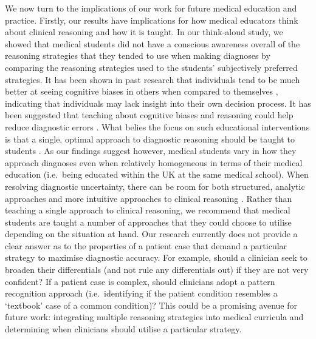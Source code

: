 \documentclass[a4paper, nobind]{templates/ociamthesis}
\begin{document}
We now turn to the implications of our work for future medical education and practice. Firstly, our results have implications for how medical educators think about clinical reasoning and how it is taught. In our think-aloud study, we showed that medical students did not have a conscious awareness overall of the reasoning strategies that they tended to use when making diagnoses by comparing the reasoning strategies used to the students' subjectively preferred strategies. It has been shown in past research that individuals tend to be much better at seeing cognitive biases in others when compared to themselves \autocite{pronin_bias_2002}, indicating that individuals may lack insight into their own decision process. It has been suggested that teaching about cognitive biases and reasoning could help reduce diagnostic errors \autocite{royce_teaching_2019}. What belies the focus on such educational interventions is that a single, optimal approach to diagnostic reasoning should be taught to students \autocite{kassirer_teaching_1983}. As our findings suggest however, medical students vary in how they approach diagnoses even when relatively homogeneous in terms of their medical education (i.e.~being educated within the UK at the same medical school). When resolving diagnostic uncertainty, there can be room for both structured, analytic approaches and more intuitive approaches to clinical reasoning \autocite{custers_medical_2013}. Rather than teaching a single approach to clinical reasoning, we recommend that medical students are taught a number of approaches that they could choose to utilise depending on the situation at hand. Our research currently does not provide a clear answer as to the properties of a patient case that demand a particular strategy to maximise diagnostic accuracy. For example, should a clinician seek to broaden their differentials (and not rule any differentials out) if they are not very confident? If a patient case is complex, should clinicians adopt a pattern recognition approach (i.e.~identifying if the patient condition resembles a `textbook' case of a common condition)? This could be a promising avenue for future work: integrating multiple reasoning strategies into medical curricula and determining when clinicians should utilise a particular strategy.\\
\end{document}
